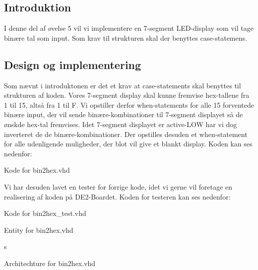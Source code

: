 \documentclass[../journal.tex]{subfiles}
\begin{document}
\subsection{Introduktion}
I denne del af øvelse 5 vil vi implementere en 7-segment LED-display som vil tage binære tal som input. Som krav til strukturen skal der benyttes case-statemens.

\subsection{Design og implementering}
Som nævnt i introduktonen er det et krav at case-statements skal benyttes til strukturen af koden. Vores 7-segment display skal kunne fremvise hex-tallene fra 1 til 15, altså fra 1 til F. Vi opstiller derfor when-statements for alle 15 forventede binære input, der vil sende binære-kombinationer til 7-segment displayet så de ønskde hex-tal fremvises. Idet 7-segment displayet er active-LOW har vi dog inverteret de de binære-kombinationer. Der opstilles desuden et when-statement for alle udenligende muligheder, der blot vil give et blankt display. Koden kan ses nedenfor:

\begin{table}[H]
    \centering
      \framebox{
        \rule{8pt}{0pt}
          
  }
  \caption{Kode for bin2hex.vhd}	
  \label{src:TabCon}
\end{table}

Vi har desuden lavet en tester for forrige kode, idet vi gerne vil foretage en realisering af koden på DE2-Boardet. Koden for testeren kan ses nedenfor:

\begin{table}[H]
    \centering
      \framebox{
        \rule{8pt}{0pt}
          
  }
  \caption{Kode for bin2hex\_test.vhd}	
  \label{src:TabConTest}
\end{table}

\begin{table}[H]
    \centering
      \framebox{
        \rule{8pt}{0pt}
          
  }
  \caption{Entity for bin2hex.vhd}	
  \label{src:bin2hex_ent}
\end{table}

s
\begin{table}[H]
    \centering
    \caption{Architechture for bin2hex.vhd}	
    \label{src:bin2hex_arch}
\end{table}
\end{document}
